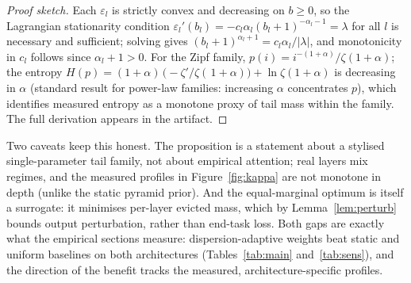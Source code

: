 \begin{proof}[Proof sketch]
Each $\varepsilon_l$ is strictly convex and decreasing on $b\ge0$, so the
Lagrangian stationarity condition
$\varepsilon_l'(b_l)=-c_l\alpha_l(b_l+1)^{-\alpha_l-1}=\lambda$ for all
$l$ is necessary and sufficient; solving gives
$(b_l+1)^{\alpha_l+1}=c_l\alpha_l/|\lambda|$, and monotonicity in $c_l$
follows since $\alpha_l+1>0$. For the Zipf family,
$p(i)=i^{-(1+\alpha)}/\zeta(1+\alpha)$; the entropy
$H(p)=(1+\alpha)\,\bigl(-\zeta'/\zeta(\,1+\alpha)\bigr)+\ln
\zeta(1+\alpha)$ is decreasing in $\alpha$ (standard result for
power-law families: increasing $\alpha$ concentrates $p$), which
identifies measured entropy as a monotone proxy of tail mass within the
family. The full derivation appears in the artifact.
\end{proof}

Two caveats keep this honest. The proposition is a statement about a
stylised single-parameter tail family, not about empirical attention;
real layers mix regimes, and the measured profiles in
Figure~\ref{fig:kappa} are not monotone in depth (unlike the static
pyramid prior). And the equal-marginal optimum is itself a surrogate: it
minimises per-layer evicted mass, which by Lemma~\ref{lem:perturb}
bounds output perturbation, rather than end-task loss. Both gaps are
exactly what the empirical sections measure: dispersion-adaptive weights
beat static and uniform baselines on both architectures
(Tables~\ref{tab:main} and~\ref{tab:sens}), and the direction of the
benefit tracks the measured, architecture-specific profiles.
